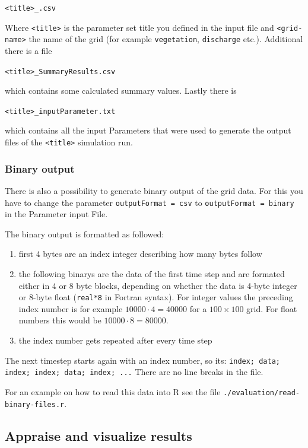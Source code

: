 \texttt{<title>\_<grid-name>.csv}

Where \texttt{<title>} is the parameter set title you defined in the input file and \texttt{<grid-name>} the name of the grid (for example \texttt{vegetation}, \texttt{discharge} etc.). Additional there is a file

\texttt{<title>\_SummaryResults.csv}

which contains some calculated summary values. Lastly there is 

\texttt{<title>\_inputParameter.txt}

which contains all the input Parameters that were used to generate the output files of the \texttt{<title>} simulation run.

\subsubsection{Binary output}
There is also a possibility to generate binary output of the grid data. For this you have to change the parameter \texttt{outputFormat = csv} to \texttt{outputFormat 	= binary} in the Parameter input File.

The binary output is formatted as followed:

\begin{enumerate}

\item first 4 bytes are an index integer describing how many bytes follow
\item the following binarys are the data of the first time step and are formated either in 4 or 8 byte blocks, depending on whether the data is 4-byte integer or 8-byte float (\texttt{real*8} in Fortran syntax). For integer values the preceding index number is for example $10000\cdot4=40000$ for a $100\times100$ grid. For float numbers this would be $10000\cdot8=80000$.
\item the index number gets repeated after every time step
\end{enumerate}

The next timestep starts again with an index number, so its:
\texttt{index; data; index; index; data; index; ...} There are no line breaks in the file.

For an example on how to read this data into R see the file \texttt{./evaluation/read-binary-files.r}.


\subsection{Appraise and visualize results}


